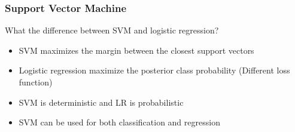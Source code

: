 \documentclass[aspectratio=169, 10pt]{beamer}
\begin{document}
\begin{frame}[t]
    \frametitle{Support Vector Machine}
    What the difference between SVM and logistic regression?
    \pause

    \begin{itemize}
        \item SVM maximizes the margin between the closest support vectors
        \item Logistic regression maximize the posterior class probability (Different loss function)
        \item SVM is deterministic and LR is probabilistic
        \item SVM can be used for both classification and regression
    \end{itemize}


\end{frame}
\end{document}
